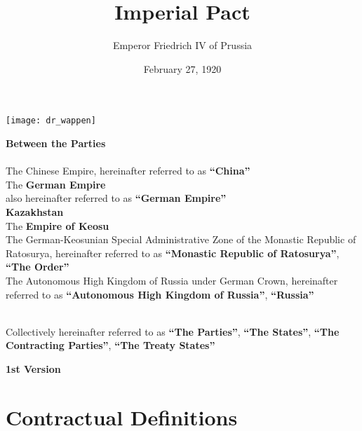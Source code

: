 \documentclass{article}
\title{Imperial Pact}
\author{Emperor Friedrich IV of Prussia}
\date{February 27, 1920}
\begin{document}
\maketitle
\begin{center}
    \texttt{[image: dr\_wappen]}
\end{center}
\begin{center}
    \textbf{Between the Parties\\}\textbf{\\}
    The Chinese Empire, hereinafter referred to as \textbf{``China''\\}
    The \textbf{German Empire\\} also hereinafter referred to as \textbf{``German Empire''\\}
    \textbf{Kazakhstan\\}
    The \textbf{Empire of Keosu\\}
    The German-Keosunian Special Administrative Zone of the Monastic Republic of Ratosurya, hereinafter referred to as \textbf{``Monastic Republic of Ratosurya''}, \textbf{``The Order''\\}
    The Autonomous High Kingdom of Russia under German Crown, hereinafter referred to as \textbf{``Autonomous High Kingdom of Russia''}, \textbf{``Russia''\\}
    \textbf{\\}

    Collectively hereinafter referred to as \textbf{``The Parties''}, \textbf{``The States''}, \textbf{``The Contracting Parties''}, \textbf{``The Treaty States''}
\end{center}
\newpage
{}
\vspace*{\fill}
\begin{Center}
\textbf{1st Version}
\vspace*{\fill}
\end{Center}
\newpage
\tableofcontents
\newpage
\section{Contractual Definitions}
\end{document}
